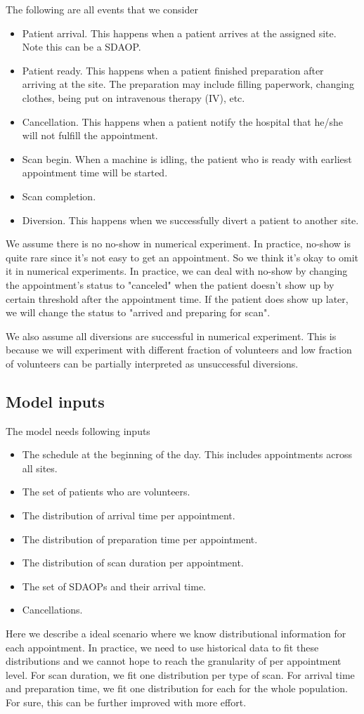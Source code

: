 The following are all events that we consider
\begin{itemize}
\item Patient arrival. This happens when a patient arrives at
      the assigned site. Note this can be a SDAOP.
\item Patient ready. This happens when a patient finished preparation
      after arriving at the site. The preparation may include filling
      paperwork, changing clothes, being put on intravenous therapy (IV),
      etc.
\item Cancellation. This happens when a patient notify the hospital
      that he/she will not fulfill the appointment.
\item Scan begin. When a machine is idling, the patient who is ready
      with earliest appointment time will be started.
\item Scan completion.
\item Diversion. This happens when we successfully divert a patient
      to another site. 
\end{itemize}
We assume there is no no-show in numerical experiment. In practice,
no-show is quite rare since it's not easy to get an appointment. So we think it's
okay to omit it in numerical experiments. In practice, we can deal
with no-show by changing the appointment's status to "canceled"
when the patient doesn't show up by certain threshold after
the appointment time. If the patient does show up later, we will
change the status to "arrived and preparing for scan".

We also assume all diversions are successful in numerical experiment.
This is because we will experiment with different fraction of volunteers
and low fraction of volunteers can be partially interpreted as
unsuccessful diversions.

\subsection{Model inputs}

The model needs following inputs
\begin{itemize}
\item The schedule at the beginning of the day. This includes
      appointments across all sites.
\item The set of patients who are volunteers.
\item The distribution of arrival time per appointment.
\item The distribution of preparation time per appointment.
\item The distribution of scan duration per appointment.
\item The set of SDAOPs and their arrival time.
\item Cancellations.
\end{itemize}
Here we describe a ideal scenario where we know distributional
information for each appointment. In practice, we need to
use historical data to fit these distributions and we cannot
hope to reach the granularity of per appointment level.
For scan duration, we fit one distribution per type of scan.
For arrival time and preparation time, we fit one distribution
for each for the whole population. For sure, this can be further
improved with more effort.

